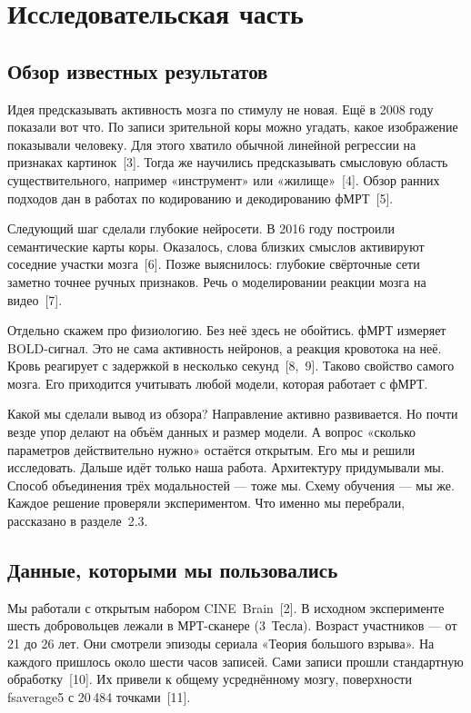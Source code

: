 \documentclass[12pt,a4paper]{article}
\begin{document}
\section{Исследовательская часть}

\subsection{Обзор известных результатов}

Идея предсказывать активность мозга по стимулу не новая. Ещё в 2008
году показали вот что. По записи зрительной коры можно угадать, какое
изображение показывали человеку. Для этого хватило обычной линейной
регрессии на признаках картинок~[3]. Тогда же научились предсказывать
смысловую область существительного, например «инструмент» или
«жилище»~[4]. Обзор ранних подходов дан в работах по кодированию и
декодированию фМРТ~[5].

Следующий шаг сделали глубокие нейросети. В 2016 году построили
семантические карты коры. Оказалось, слова близких смыслов активируют
соседние участки мозга~[6]. Позже выяснилось: глубокие свёрточные сети
заметно точнее ручных признаков. Речь о моделировании реакции мозга на
видео~[7].

Отдельно скажем про физиологию. Без неё здесь не обойтись. фМРТ
измеряет BOLD-сигнал. Это не сама активность нейронов, а реакция
кровотока на неё. Кровь реагирует с задержкой в несколько
секунд~[8,~9]. Таково свойство самого мозга. Его приходится учитывать
любой модели, которая работает с фМРТ.

Какой мы сделали вывод из обзора? Направление активно развивается. Но
почти везде упор делают на объём данных и размер модели. А вопрос
«сколько параметров действительно нужно» остаётся открытым. Его мы и
решили исследовать. Дальше идёт только наша работа. Архитектуру
придумывали мы. Способ объединения трёх модальностей — тоже мы. Схему
обучения — мы же. Каждое решение проверяли экспериментом. Что именно мы
перебрали, рассказано в разделе~2.3.

\subsection{Данные, которыми мы пользовались}

Мы работали с открытым набором CINE~Brain~[2]. В исходном эксперименте
шесть добровольцев лежали в МРТ-сканере (3~Тесла). Возраст участников —
от 21 до 26 лет. Они смотрели эпизоды сериала «Теория большого
взрыва». На каждого пришлось около шести часов записей. Сами записи
прошли стандартную обработку~[10]. Их привели к общему усреднённому
мозгу, поверхности fsaverage5 с 20\,484 точками~[11].
\end{document}
